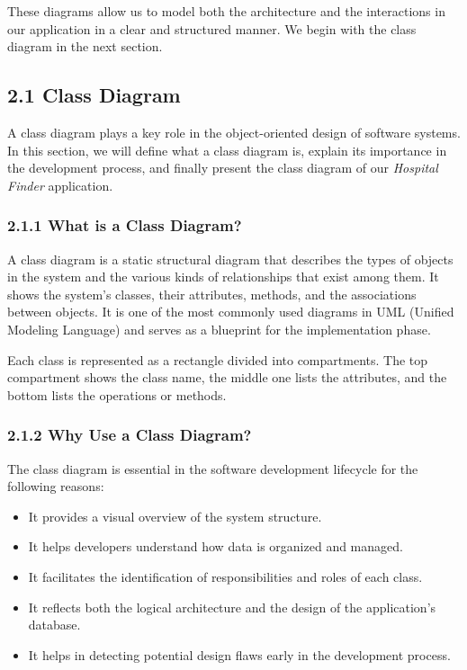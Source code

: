 \documentclass[12pt]{report}
\begin{document}
These diagrams allow us to model both the architecture and the interactions in our application in a clear and structured manner. We begin with the class diagram in the next section.

\subsection*{2.1 Class Diagram}

A class diagram plays a key role in the object-oriented design of software systems. In this section, we will define what a class diagram is, explain its importance in the development process, and finally present the class diagram of our \textit{Hospital Finder} application.

\subsubsection*{2.1.1 What is a Class Diagram?}

A class diagram is a static structural diagram that describes the types of objects in the system and the various kinds of relationships that exist among them. It shows the system's classes, their attributes, methods, and the associations between objects. It is one of the most commonly used diagrams in UML (Unified Modeling Language) and serves as a blueprint for the implementation phase.

\noindent Each class is represented as a rectangle divided into compartments. The top compartment shows the class name, the middle one lists the attributes, and the bottom lists the operations or methods.

\subsubsection*{2.1.2 Why Use a Class Diagram?}

The class diagram is essential in the software development lifecycle for the following reasons:

\begin{itemize}
    \item It provides a visual overview of the system structure.
    \item It helps developers understand how data is organized and managed.
    \item It facilitates the identification of responsibilities and roles of each class.
    \item It reflects both the logical architecture and the design of the application's database.
    \item It helps in detecting potential design flaws early in the development process.
\end{itemize}
\end{document}
